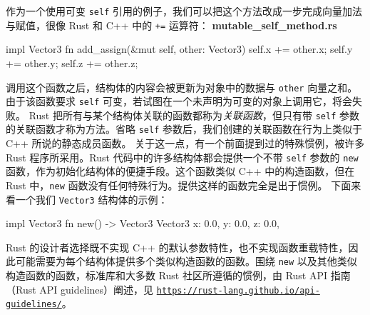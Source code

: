 作为一个使用可变 \texttt{self} 引用的例子，我们可以把这个方法改成一步完成向量加法与赋值，很像 Rust 和 C++ 中的 \texttt{+=} 运算符：
\textbf{mutable\_\allowbreak{}self\_\allowbreak{}method.\allowbreak{}rs}
\begin{codebox}[rust]
 impl Vector3 {
    fn add_assign(&mut self, other: Vector3) {
        self.x += other.x;
        self.y += other.y;
        self.z += other.z;
    }
}
\end{codebox}
\label{idx:idx_f060f199}
调用这个函数之后，结构体的内容会被更新为对象中的数据与 \texttt{other} 向量之和。由于该函数要求 \texttt{self} 可变，若试图在一个未声明为可变的对象上调用它，将会失败。
Rust 把所有与某个结构体关联的函数都称为\emph{关联函数}，但只有带 \texttt{self} 参数的关联函数才称为方法。省略 \texttt{self} 参数后，我们创建的关联函数在行为上类似于 C++ 所说的静态成员函数。
关于这一点，有一个前面提到过的特殊惯例，被许多 Rust 程序所采用。Rust 代码中的许多结构体都会提供一个不带 \texttt{self} 参数的 \texttt{new} 函数，作为初始化结构体的便捷手段。这个函数类似 C++ 中的构造函数，但在 Rust 中，\texttt{new} 函数没有任何特殊行为。提供这样的函数完全是出于惯例。
下面来看一个我们 \texttt{Vector3} 结构体的示例：
\begin{codebox}[rust]
impl Vector3 {
    fn new() -> Vector3 {
        Vector3 {
            x: 0.0,
            y: 0.0,
            z: 0.0,
        }
    }
}
\end{codebox}
\label{idx:idx_c6ca16b4}
\label{idx:idx_1decdcb0}
Rust 的设计者选择既不实现 C++ 的默认参数特性，也不实现函数重载特性，因此可能需要为每个结构体提供多个类似构造函数的函数。围绕 \texttt{new} 以及其他类似构造函数的函数，标准库和大多数 Rust 社区所遵循的惯例，由 Rust API 指南（Rust API guidelines）阐述，见 \href{https://rust-lang.github.io/api-guidelines/}{\texttt{https:/\allowbreak{}/\allowbreak{}rust-\allowbreak{}lang.\allowbreak{}github.\allowbreak{}io/\allowbreak{}api-\allowbreak{}guidelines/\allowbreak{}}}。
